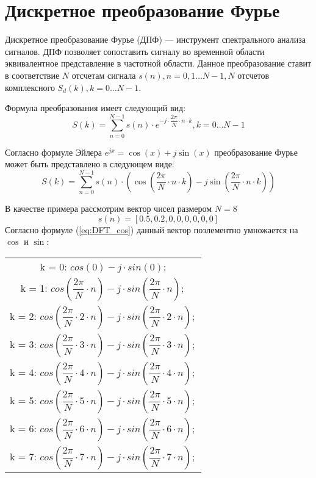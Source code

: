 \section{Дискретное преобразование Фурье}
Дискретное преобразование Фурье (ДПФ) --- инструмент спектрального анализа сигналов. ДПФ позволяет сопоставить сигналу во временной области эквивалентное представление в частотной области.
Данное преобразование ставит в соответствие \(N\) отсчетам сигнала \(s(n), n = 0, 1 \dots N-1,  N\) отсчетов комплексного \(S_d(k), k = 0 \dots N-1 \).

Формула преобразования имеет следующий вид:
\begin{equation}
    S(k) = \sum_{n=0}^{N-1} s(n) \cdot e^{-j \cdot \dfrac{2\pi}{N} \cdot n \cdot k}, k = 0 \dots N-1
\end{equation}

Согласно формуле Эйлера \(e^{jx} = \cos(x) + j\sin(x)\) преобразование Фурье может быть представлено в следующем виде:
\begin{equation} \label{eq:DFT_cos}
    S(k) = \sum_{n=0}^{N-1} s(n) \cdot (\cos(\dfrac{2\pi}{N} \cdot n \cdot k) - j \sin(\dfrac{2\pi}{N} \cdot n \cdot k))
\end{equation}

В качестве примера рассмотрим вектор чисел размером \(N = 8 \)
\begin{equation*}
    s(n) = [0.5, 0.2, 0, 0, 0, 0, 0, 0]
\end{equation*}
Согласно формуле (\ref{eq:DFT_cos}) данный вектор поэлементно умножается на \(\cos\) и \(\sin\):

\begin{table}[H]
    \centering
    \begin{tabular}{c}
        k = 0: \(cos(0) - j \cdot sin(0)\); \\
        k = 1: \(cos(\dfrac{2\pi}{N} \cdot n) - j \cdot sin(\dfrac{2\pi}{N} \cdot n);\) \\
        k = 2: \(cos(\dfrac{2\pi}{N} \cdot 2 \cdot n) - j \cdot sin(\dfrac{2\pi}{N} \cdot 2 \cdot n);\)  \\
        k = 3: \(cos(\dfrac{2\pi}{N} \cdot 3 \cdot n) - j \cdot sin(\dfrac{2\pi}{N} \cdot 3 \cdot  n);\) \\
        k = 4: \(cos(\dfrac{2\pi}{N} \cdot 4 \cdot n) - j \cdot sin(\dfrac{2\pi}{N} \cdot 4 \cdot n);\)  \\
        k = 5: \(cos(\dfrac{2\pi}{N} \cdot 5 \cdot n) - j \cdot sin(\dfrac{2\pi}{N} \cdot 5 \cdot n);\) \\
        k = 6: \(cos(\dfrac{2\pi}{N} \cdot 6 \cdot n) - j \cdot sin(\dfrac{2\pi}{N} \cdot 6 \cdot n);\)  \\
        k = 7: \(cos(\dfrac{2\pi}{N} \cdot 7 \cdot n) - j \cdot sin(\dfrac{2\pi}{N} \cdot 7 \cdot n);\) \\
    \end{tabular}
\end{table}

